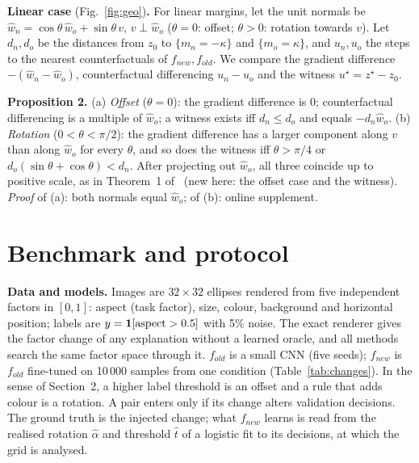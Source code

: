 \documentclass{esannV2}
\begin{document}
\textbf{Linear case} (Fig.~\ref{fig:geo})\textbf{.} For linear margins, let the unit normals be $\hat w_n=\cos\theta\,\hat w_o+\sin\theta\,v$, $v\perp\hat w_o$ ($\theta=0$: offset; $\theta>0$: rotation towards $v$). Let $d_n,d_o$ be the distances from $z_0$ to $\{m_n=-\kappa\}$ and $\{m_o=\kappa\}$, and $u_n,u_o$ the steps to the nearest counterfactuals of $f_{new},f_{old}$. We compare the gradient difference~\cite{artelt1} $-(\hat w_n-\hat w_o)$, counterfactual differencing $u_n-u_o$ and the witness $u^\star=z^\star-z_0$.

\textbf{Proposition 2.} (a) \emph{Offset} ($\theta=0$): the gradient difference is $0$; counterfactual differencing is a multiple of $\hat w_o$; a witness exists iff $d_n\le d_o$ and equals $-d_n\hat w_o$. (b) \emph{Rotation} ($0<\theta<\pi/2$): the gradient difference has a larger component along $v$ than along $\hat w_o$ for every $\theta$, and so does the witness iff $\theta>\pi/4$ or $d_o(\sin\theta+\cos\theta)<d_n$. After projecting out $\hat w_o$, all three coincide up to positive scale, as in Theorem~1 of~\cite{artelt1} (new here: the offset case and the witness). \emph{Proof} of (a): both normals equal $\hat w_o$; of (b): online supplement.

\section{Benchmark and protocol}

\textbf{Data and models.} Images are $32\times32$ ellipses rendered from five independent factors in $[0,1]$: aspect (task factor), size, colour, background and horizontal position; labels are $y=\mathbbm 1[\text{aspect}>0.5]$ with 5\% noise. The exact renderer gives the factor change of any explanation without a learned oracle, and all methods search the same factor space through it. $f_{old}$ is a small CNN (five seeds); $f_{new}$ is $f_{old}$ fine-tuned on 10\,000 samples from one condition (Table~\ref{tab:changes}). In the sense of Section~2, a higher label threshold is an offset and a rule that adds colour is a rotation. A pair enters only if its change alters validation decisions. The ground truth is the injected change; what $f_{new}$ learns is read from the realised rotation $\hat\alpha$ and threshold $\hat t$ of a logistic fit to its decisions, at which the grid is analysed.
\end{document}
